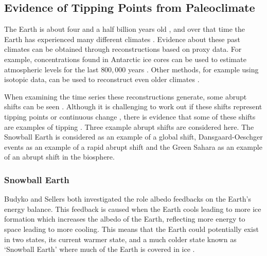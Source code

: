 \subsection{Evidence of Tipping Points from Paleoclimate}
The Earth is about four and a half billion years old \parencite{Dalrymple2001}, and over that time the Earth has experienced many different climates \parencite{Alley2003}.
Evidence about these past climates can be obtained through reconstructions based on proxy data.
For example,  concentrations found in Antarctic ice cores can be used to estimate atmospheric  levels for the
last $800,000$ years \parencite{Bereiter2015}. Other methods, for example using isotopic data, can be used to reconstruct even older climates \parencite{Tierney2020}.

When examining the time series these reconstructions generate, some abrupt shifts can be seen \parencite{Boers2022,Brovkin2021}. Although it is challenging to work out if these
shifts represent tipping points or continuous change \parencite{Brovkin2008}, there is evidence that some of these shifts are examples of tipping \parencite{Dakos2008}.
Three example abrupt shifts are considered here.
The Snowball Earth is considered as an example of a global shift, Dansgaard-Oeschger events as an example of a rapid abrupt shift and the Green Sahara as an example of an abrupt shift in
the biosphere.

\subsubsection{Snowball Earth}
Budyko and Sellers \parencite{Budyko1969,Sellers1969} both investigated the role albedo feedbacks on the Earth's energy balance. This feedback is caused when the Earth cools leading to more
ice formation which increases the albedo of the Earth, reflecting more energy to space leading to more cooling. This means that the
Earth could potentially exist in two states, its current warmer state, and a much colder state known as `Snowball Earth' where much of the Earth is covered in ice \parencite{Ghil1976,Held1974}. 

